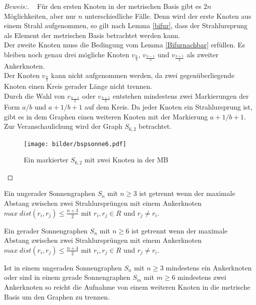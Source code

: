 \begin{proof}[Beweis:]~
Für den ersten Knoten in der metrischen Basis gibt es $2n$ Möglichkeiten, aber nur $n$ unterschiedliche Fälle. Denn wird der erste Knoten aus einem Strahl aufgenommen, so gilt nach Lemma \ref{bifur}, dass der Strahlursprung als Element der metrischen Basis betrachtet werden kann.\\
Der zweite Knoten muss die Bedingung vom Lemma \ref{Bifurnachbar} erfüllen. Es bleiben noch genau drei mögliche Knoten $v_{\frac{n}{2}}$, $v_{\frac{n-1}{2}}$ und $v_{\frac{n+1}{2}}$ als zweiter Ankerknoten.\\ 
Der Knoten $v_{\frac{n}{2}}$ kann nicht aufgenommen werden, da zwei gegenüberliegende Knoten einen Kreis gerader Länge nicht trennen.\\
Durch die Wahl von $v_{\frac{n-1}{2}}$ oder $v_{\frac{n+1}{2}}$ entstehen mindestens zwei Markierungen der Form $a/b$ und $a+1/b+1$ auf dem Kreis. Da jeder Knoten ein Strahlursprung ist, gibt es in dem Graphen einen weiteren Knoten mit der Markierung $a+1/b+1$. Zur Veranschaulichung wird der Graph $S_{6,2}$ betrachtet.
\begin{figure}[h!]
		\centering
 		 \texttt{[image: bilder/bspsonne6.pdf]}
   \caption{Ein markierter $S_{6,2}$ mit zwei Knoten in der MB}
  	 \end{figure}
\end{proof}
\begin{lem}
Ein ungerader Sonnengraphen $S_n$ mit $n\geq 3$ ist getrennt wenn der maximale Abstang zwischen zwei Strahlursprüngen mit einem Ankerknoten $max\;dist(r_i,r_j)\leq \frac{n+3}{2}$ mit $r_i,r_j \in R$ und $r_j\neq r_i$.
\end{lem}

\begin{lem}
Ein gerader Sonnengraphen $S_n$ mit $n\geq 6$ ist getrennt wenn der maximale Abstang zwischen zwei Strahlursprüngen mit einem Ankerknoten $max\;dist(r_i,r_j)\leq \frac{n+4}{2}$ mit $r_i,r_j \in R$ und $r_j\neq r_i$.
\end{lem}
\begin{lem}
Ist in einem ungeraden Sonnengraphen $S_n$ mit $n\geq 3$ mindestens ein Ankerknoten oder sind in einem gerade Sonnengraphen $S_m$ mit $m\geq 6$ mindestens zwei Ankerknoten so reicht die Aufnahme von einem weiteren Knoten in die metrische Basis um den Graphen zu trennen. 
\end{lem}

